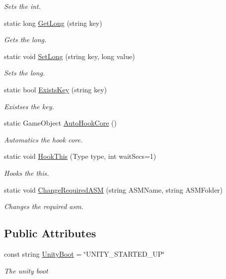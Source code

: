\begin{DoxyCompactItemize}
\begin{DoxyCompactList}\small\item\em Sets the int. \end{DoxyCompactList}\item 
static long \hyperlink{class_lerp2_a_p_i_1_1_lerped_core_a8c3bf0c6dc234b2955fdc29bd780d276}{Get\+Long} (string key)
\begin{DoxyCompactList}\small\item\em Gets the long. \end{DoxyCompactList}\item 
static void \hyperlink{class_lerp2_a_p_i_1_1_lerped_core_a88491e9a5266926892183670b659c4f9}{Set\+Long} (string key, long value)
\begin{DoxyCompactList}\small\item\em Sets the long. \end{DoxyCompactList}\item 
static bool \hyperlink{class_lerp2_a_p_i_1_1_lerped_core_afba4bf83e85fef6ec27d94fa535fa2b0}{Exists\+Key} (string key)
\begin{DoxyCompactList}\small\item\em Existses the key. \end{DoxyCompactList}\item 
static Game\+Object \hyperlink{class_lerp2_a_p_i_1_1_lerped_core_a08686dd819d1bf6f193fd0d19e9aaf44}{Auto\+Hook\+Core} ()
\begin{DoxyCompactList}\small\item\em Automatics the hook core. \end{DoxyCompactList}\item 
static void \hyperlink{class_lerp2_a_p_i_1_1_lerped_core_af512946193066845c4eedb9aee4c5a24}{Hook\+This} (Type type, int wait\+Secs=1)
\begin{DoxyCompactList}\small\item\em Hooks the this. \end{DoxyCompactList}\item 
static void \hyperlink{class_lerp2_a_p_i_1_1_lerped_core_aafa1793eca75685416f09ab96e2daebc}{Change\+Required\+A\+SM} (string A\+S\+M\+Name, string A\+S\+M\+Folder)
\begin{DoxyCompactList}\small\item\em Changes the required asm. \end{DoxyCompactList}\end{DoxyCompactItemize}
\subsection*{Public Attributes}
\begin{DoxyCompactItemize}
\item 
const string \hyperlink{class_lerp2_a_p_i_1_1_lerped_core_a627d9992398d79b222731f131d2f40c0}{Unity\+Boot} = \char`\"{}U\+N\+I\+T\+Y\+\_\+\+S\+T\+A\+R\+T\+E\+D\+\_\+\+UP\char`\"{}
\begin{DoxyCompactList}\small\item\em The unity boot \end{DoxyCompactList}\end{DoxyCompactItemize}
